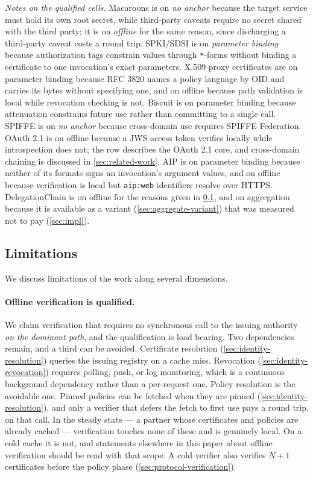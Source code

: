 \documentclass[11pt,a4paper]{article}
\begin{document}
\emph{Notes on the qualified cells.} Macaroons is \tpart{} on
\emph{no anchor} because the target service must hold its own root
secret, while third-party caveats require no secret shared with the
third party; it is \tpart{} on \emph{offline} for the same reason, since
discharging a third-party caveat costs a round trip. SPKI/SDSI is
\tpart{} on \emph{parameter binding} because authorization tags
constrain values through \texttt{*}-forms without binding a certificate
to one invocation's exact parameters. X.509 proxy certificates are
\tunspec{} on parameter binding because RFC 3820 names a policy language
by OID and carries its bytes without specifying one, and \tpart{} on
offline because path validation is local while revocation checking is
not. Biscuit is \tno{} on parameter binding because attenuation
constrains future use rather than committing to a single call. SPIFFE is
\tpart{} on \emph{no anchor} because cross-domain use requires SPIFFE
Federation. OAuth 2.1 is \tpart{} on offline because a JWS access token
verifies locally while introspection does not; the row describes the
OAuth 2.1 core, and cross-domain chaining is discussed in
\cref{sec:related-work}. AIP is \tno{} on parameter binding because
neither of its formats signs an invocation's argument values, and
\tpart{} on offline because verification is local but \texttt{aip:web}
identifiers resolve over HTTPS. DelegationChain is
\tpart{} on offline for the reasons given in \cref{sec:limitations}, and
\tpart{} on aggregation because it is available as a variant
(\cref{sec:aggregate-variant}) that was measured not to pay
(\cref{sec:impl}).

\subsection{Limitations}
\label{sec:limitations}

We discuss limitations of the work along several dimensions.

\paragraph{Offline verification is qualified.}
We claim verification that requires no synchronous call to the issuing
authority \emph{on the dominant path}, and the qualification is load
bearing. Two dependencies remain, and a third can be avoided.
Certificate resolution (\cref{sec:identity-resolution}) queries the
issuing registry on a cache miss. Revocation
(\cref{sec:identity-revocation}) requires polling, push, or log
monitoring, which is a continuous background dependency rather than a
per-request one. Policy resolution is the avoidable one. Pinned
policies can be fetched when they are pinned
(\cref{sec:identity-resolution}), and only a verifier that defers the
fetch to first use pays a round trip, on that call. In the steady state --- a partner whose
certificates and policies are already cached --- verification touches
none of these and is genuinely local. On a cold cache it is not, and
statements elsewhere in this paper about offline verification should be
read with that scope. A cold verifier also verifies $N + 1$
certificates before the policy phase (\cref{sec:protocol-verification}).
\end{document}
